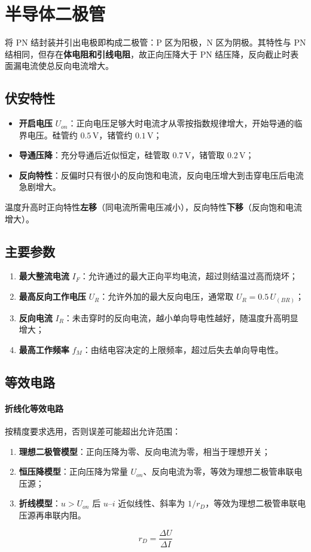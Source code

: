 \section{半导体二极管}

将 PN 结封装并引出电极即构成二极管：P 区为阳极，N 区为阴极。其特性与 PN 结相同，但存在\textbf{体电阻和引线电阻}，故正向压降大于 PN 结压降，反向截止时表面漏电流使总反向电流增大。

\subsection{伏安特性}
\begin{itemize}
    \item \textbf{开启电压} $U_{on}$：正向电压足够大时电流才从零按指数规律增大，开始导通的临界电压。硅管约 $0.5\,\text{V}$，锗管约 $0.1\,\text{V}$；
    \item \textbf{导通压降}：充分导通后近似恒定，硅管取 $0.7\,\text{V}$，锗管取 $0.2\,\text{V}$；
    \item \textbf{反向特性}：反偏时只有很小的反向饱和电流，反向电压增大到击穿电压后电流急剧增大。
\end{itemize}
温度升高时正向特性\textbf{左移}（同电流所需电压减小），反向特性\textbf{下移}（反向饱和电流增大）。

\subsection{主要参数}
\begin{enumerate}
    \item \textbf{最大整流电流} $I_F$：允许通过的最大正向平均电流，超过则结温过高而烧坏；
    \item \textbf{最高反向工作电压} $U_R$：允许外加的最大反向电压，通常取 $U_R=0.5\,U_{(BR)}$；
    \item \textbf{反向电流} $I_R$：未击穿时的反向电流，越小单向导电性越好，随温度升高明显增大；
    \item \textbf{最高工作频率} $f_M$：由结电容决定的上限频率，超过后失去单向导电性。
\end{enumerate}

\subsection{等效电路}

\paragraph{折线化等效电路} 按精度要求选用，否则误差可能超出允许范围：
\begin{enumerate}
    \item \textbf{理想二极管模型}：正向压降为零、反向电流为零，相当于理想开关；
    \item \textbf{恒压降模型}：正向压降为常量 $U_{on}$、反向电流为零，等效为理想二极管串联电压源；
    \item \textbf{折线模型}：$u>U_{on}$ 后 $u$--$i$ 近似线性、斜率为 $1/r_D$，等效为理想二极管串联电压源再串联内阻。
\end{enumerate}
\begin{equation}
r_D = \frac{\Delta U}{\Delta I}
\end{equation}


